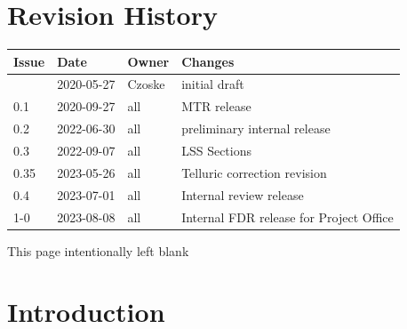 \documentclass[11pt,oneside,a4paper]{article}
\begin{document}





\clearpage
\pagestyle{fancy}

\section*{Revision History}

\renewcommand{\arraystretch}{1.2}
\begin{tabularx}{\textwidth}{|l|l|l|X|}
  \hline
  \rowcolor{rd1}
  \textbf{Issue} & \textbf{Date} & \textbf{Owner} & \textbf{Changes} \\
  \hline
                 & 2020-05-27    & Czoske         & initial draft    \\
  0.1            & 2020-09-27    & all            & MTR release      \\
  0.2            & 2022-06-30    & all            & preliminary internal release      \\
  0.3            & 2022-09-07    & all  & LSS Sections \\
  0.35           & 2023-05-26    & all   & Telluric correction revision \\
  0.4            & 2023-07-01    & all   & Internal review release \\
  1-0            & 2023-08-08    & all   & Internal FDR release for Project Office \\
  \hline
\end{tabularx}


\newpage
\tableofcontents
\clearpage
\listoffigures
\clearpage
\listoftables

\clearpage
\phantom{a}
\vfill
\begin{center}
  This page intentionally left blank
\end{center}
\vfill
\clearpage



\section{Introduction}
\label{sec:intro}
\end{document}
